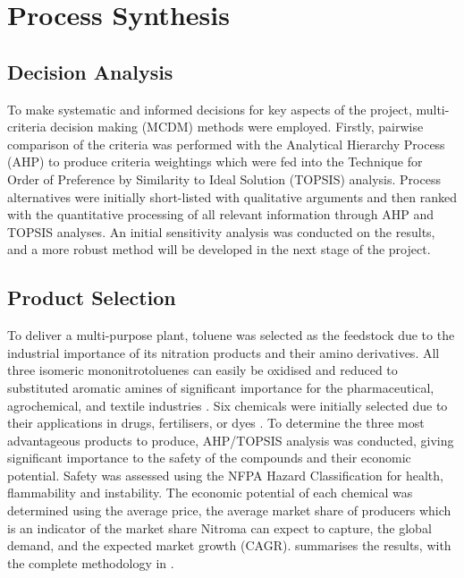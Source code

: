 \section{Process Synthesis }
\label{sec:synthesis}
\subsection{Decision Analysis}

To make systematic and informed decisions for key aspects of the project, multi-criteria decision making (MCDM) methods were employed. Firstly, pairwise comparison of the criteria was performed with the Analytical Hierarchy Process (AHP) to produce criteria weightings which were fed into the Technique for Order of Preference by Similarity to Ideal Solution (TOPSIS) analysis. Process alternatives were initially short-listed with qualitative arguments and then ranked with the quantitative processing of all relevant information through AHP and TOPSIS analyses. An initial sensitivity analysis was conducted on the results, and a more robust method will be developed in the next stage of the project.


\subsection{Product Selection}
To deliver a multi-purpose plant, toluene was selected as the feedstock due to the industrial importance of its nitration products and their amino derivatives. All three isomeric mononitrotoluenes can easily be oxidised and reduced to substituted aromatic amines of significant importance for the pharmaceutical, agrochemical, and textile industries \cite{dugal_nitrobenzene_2005}. Six chemicals were initially selected due to their applications in drugs, fertilisers, or dyes \cite{bowers_toluidines_2000,bruhne_benzaldehyde_2011,maki_benzoic_2000}. To determine the three most advantageous products to produce, AHP/TOPSIS analysis was conducted, giving significant importance to the safety of the compounds and their economic potential. Safety was assessed using the NFPA Hazard Classification for health, flammability and instability. The economic potential of each chemical was determined using the average price, the average market share of producers which is an indicator of the market share Nitroma can expect to capture, the global demand, and the expected market growth (CAGR).  summarises the results, with the complete methodology in .

